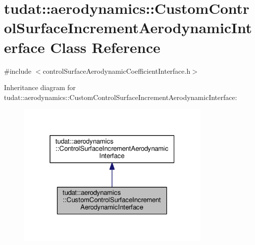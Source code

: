 \hypertarget{classtudat_1_1aerodynamics_1_1CustomControlSurfaceIncrementAerodynamicInterface}{}\section{tudat\+:\+:aerodynamics\+:\+:Custom\+Control\+Surface\+Increment\+Aerodynamic\+Interface Class Reference}
\label{classtudat_1_1aerodynamics_1_1CustomControlSurfaceIncrementAerodynamicInterface}


{\ttfamily \#include $<$control\+Surface\+Aerodynamic\+Coefficient\+Interface.\+h$>$}



Inheritance diagram for tudat\+:\+:aerodynamics\+:\+:Custom\+Control\+Surface\+Increment\+Aerodynamic\+Interface\+:
\nopagebreak
\begin{figure}[H]
\begin{center}
\leavevmode
\includegraphics[width=268pt]{classtudat_1_1aerodynamics_1_1CustomControlSurfaceIncrementAerodynamicInterface__inherit__graph}
\end{center}
\end{figure}


